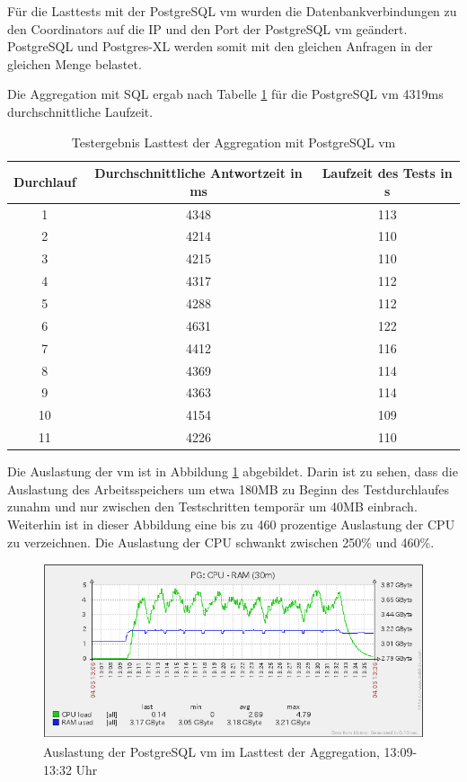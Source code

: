 Für die Lasttests mit der PostgreSQL \Gls{vm} wurden die Datenbankverbindungen zu den Coordinators auf die IP und den Port der PostgreSQL \Gls{vm} geändert.
PostgreSQL und Postgres-XL werden somit mit den gleichen Anfragen in der gleichen Menge belastet.

Die Aggregation mit SQL ergab nach Tabelle \ref{tbl:ergebnisseTest1PG} für die PostgreSQL \Gls{vm} 4319ms durchschnittliche Laufzeit.
\begin{table}[h!]
\centering
\begin{tabular}{c|c|c}
\textbf{Durchlauf} & \textbf{Durchschnittliche Antwortzeit in ms} & \textbf{Laufzeit des Tests in s} \\ \hline
1 & 4348 & 113 \\ \hline
2 & 4214 & 110 \\ \hline
3 & 4215 & 110 \\ \hline
4 & 4317 & 112 \\ \hline
5 & 4288 & 112 \\ \hline 
6 & 4631 & 122 \\ \hline
7 & 4412 & 116 \\ \hline
8 & 4369 & 114 \\ \hline
9 & 4363 & 114 \\ \hline 
10 & 4154 & 109 \\ \hline
11 & 4226 & 110 \\	
\end{tabular}
\caption[Testergebnis Lasttest der Aggregation mit PostgreSQL \Gls{vm}]{Testergebnis Lasttest der Aggregation mit PostgreSQL \Gls{vm}}
\label{tbl:ergebnisseTest1PG}
\end{table}

Die Auslastung der \Gls{vm} ist in Abbildung \ref{fig:auslastungTest1_pg} abgebildet.
Darin ist zu sehen, dass die Auslastung des Arbeitsspeichers um etwa 180MB zu Beginn des Testdurchlaufes zunahm und nur zwischen den Testschritten temporär um 40MB einbrach.
Weiterhin ist in dieser Abbildung eine bis zu 460 prozentige Auslastung der CPU zu verzeichnen.
Die Auslastung der CPU schwankt zwischen 250\%{} und 460\%{}.
\begin{figure}[h!]
\centering
\includegraphics[width=\textwidth]{Testergebnisse/jdbc_aggregation_pg_Testlauf.png}
\caption[Auslastung der PostgreSQL \Gls{vm} im Lasttest der Aggregatoin]{Auslastung der PostgreSQL \Gls{vm} im Lasttest der Aggregation, 13:09-13:32 Uhr}
\label{fig:auslastungTest1_pg}
\end{figure}


